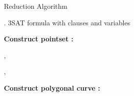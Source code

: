\documentclass[a4paper,UKenglish]{lipics}
\begin{document}
\begin{algorithm} 
\caption {{\sc Reduction Algorithm}} 
\label{alg:reduction}
\begin{algorithmic}[1]
	.\baselineskip
	\REQUIRE  3SAT formula  with  clauses  and  variables 
	

	\vspace{0.1in}
		
	\hspace{-0.2in} {\bf Construct pointset :}  

	\STATE  \label{l:init}
	


 
	\STATE  \label{l:makeSStart}

	   \label{l:makeSLoop}

	\STATE 
		 \STATE 
	

	   
  
	\STATE , 

	\STATE       		\label{l:ComputeNextEven}
    
		\ELSE
	\STATE ,  
    
	\STATE       		\label{l:ComputeNextOdd}

  




	

	


	\ENDIF
	

  


\STATE 

    \STATE    \label{l:EndLoopPointSet}

	\ENDFOR






	  \label{l:ComputeV}
	  \STATE   
      \STATE   
		\ELSE
	   \STATE   
      \STATE   
	\ENDIF

	\STATE 
	\STATE 

    \STATE  \label{l:makeSEnd}



 	

\vspace{0.15in}

	\hspace{-0.25in} {\bf Construct polygonal curve :}  

	
	\STATE  \label{l:makeP}

		

	\STATE   



\end{algorithmic}
\end{algorithm}
\end{document}
